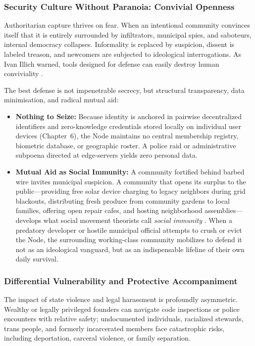 \subsubsection{Security Culture Without Paranoia: Convivial Openness}

Authoritarian capture thrives on fear. When an intentional community convinces itself that it is entirely surrounded by infiltrators, municipal spies, and saboteurs, internal democracy collapses. Informality is replaced by suspicion, dissent is labeled treason, and newcomers are subjected to ideological interrogations. As Ivan Illich warned, tools designed for defense can easily destroy human conviviality \parencite{illich1973}.

The best defense is not impenetrable secrecy, but structural transparency, data minimisation, and radical mutual aid:
\begin{itemize}
    \item \textbf{Nothing to Seize:} Because identity is anchored in pairwise decentralized identifiers and zero-knowledge credentials stored locally on individual user devices (Chapter~6), the Node maintains no central membership registry, biometric database, or geographic roster. A police raid or administrative subpoena directed at edge-servers yields zero personal data.
    \item \textbf{Mutual Aid as Social Immunity:} A community fortified behind barbed wire invites municipal suspicion. A community that opens its surplus to the public---providing free solar device charging to legacy neighbors during grid blackouts, distributing fresh produce from community gardens to local families, offering open repair cafes, and hosting neighborhood assemblies---develops what social movement theorists call \textit{social immunity} \parencite{kropotkin1902}. When a predatory developer or hostile municipal official attempts to crush or evict the Node, the surrounding working-class community mobilizes to defend it not as an ideological vanguard, but as an indispensable lifeline of their own daily survival.
\end{itemize}

\subsubsection{Differential Vulnerability and Protective Accompaniment}

The impact of state violence and legal harassment is profoundly asymmetric. Wealthy or legally privileged founders can navigate code inspections or police encounters with relative safety; undocumented individuals, racialized stewards, trans people, and formerly incarcerated members face catastrophic risks, including deportation, carceral violence, or family separation.

